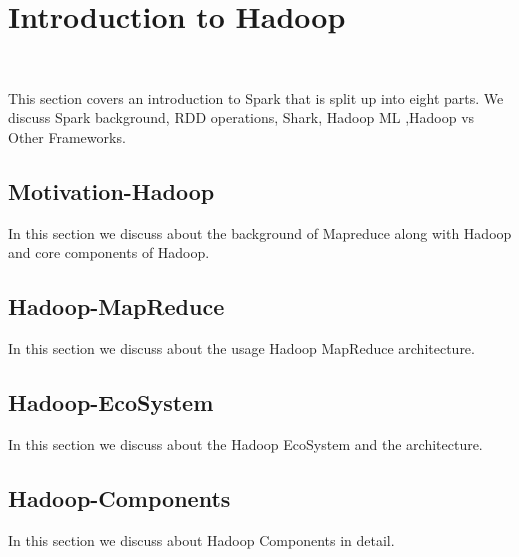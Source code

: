 \section{Introduction to Hadoop}
\label{c:spark}
\FILENAME\

This section covers an introduction to Spark that is split up
into eight parts. We discuss Spark background, RDD operations,
Shark, Hadoop ML ,Hadoop vs Other Frameworks.

\subsection{Motivation-Hadoop}
\label{s:motivation-spark}

In this section we discuss about the background of Mapreduce along with Hadoop and
core components of Hadoop.

\subsection{Hadoop-MapReduce}

In this section we discuss about the usage Hadoop MapReduce architecture.

\subsection{Hadoop-EcoSystem}

In this section we discuss about the Hadoop EcoSystem and the architecture. 

\subsection{Hadoop-Components}

In this section we discuss about Hadoop Components in detail.


